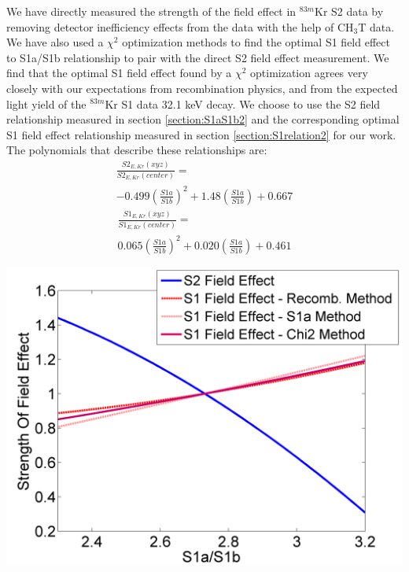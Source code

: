 We have directly measured the strength of the field effect in $^{83m}$Kr S2 data by removing detector inefficiency effects from the data with the help of CH$_3$T data.  We have also used a $\chi^2$ optimization methods to find the optimal S1 field effect to S1a/S1b relationship to pair with the direct S2 field effect measurement.  We find that the optimal S1 field effect found by a $\chi^2$ optimization agrees very closely with our expectations from recombination physics, and from the expected light yield of the $^{83m}$Kr S1 data 32.1 keV decay.   We choose to use the S2 field relationship measured in section \ref{section:S1aS1b2} and the corresponding optimal S1 field effect relationship measured in section \ref{section:S1relation2} for our work.  The polynomials that describe these relationships are:
\begin{multline}
\frac{S2_{E,Kr}(xyz)}{S2_{E,Kr}(center)} =   \\ -0.499 \left(\frac{S1a}{S1b} \right)^2 + 1.48  \left(\frac{S1a}{S1b} \right) + 0.667
\end{multline}
\begin{multline}
\frac{S1_{E,Kr}(xyz)}{S1_{E,Kr}(center)} = \\  0.065 \left(\frac{S1a}{S1b} \right)^2 + 0.020 \left(\frac{S1a}{S1b} \right) + 0.461
\end{multline}


\begin{center}
\includegraphics[scale=0.4]{Run04Corrections/StrengthOfFieldEffectOverlay.png}
 \label{AllMeasurements}
\end{center}


